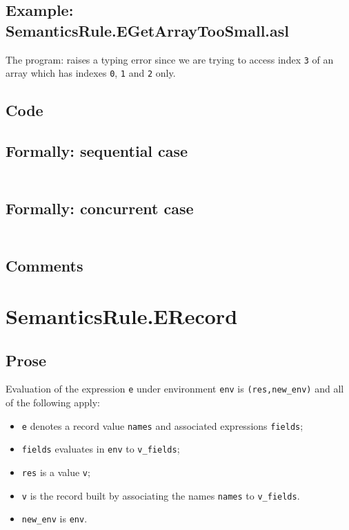 \documentclass{book}
\begin{document}
  \subsection{Example: SemanticsRule.EGetArrayTooSmall.asl}
    The program:
    raises a typing error since we are trying to access index \texttt{3} of an array
    which has indexes \texttt{0}, \texttt{1} and \texttt{2} only.

  \subsection{Code}

  \subsection{Formally: sequential case}
  \begin{align}
  \end{align} 

  \subsection{Formally: concurrent case}
  \begin{align}
  \end{align} 

  \subsection{Comments}

\section{SemanticsRule.ERecord \label{sec:SemanticsRule.ERecord}}

  \subsection{Prose}

  Evaluation of the expression \texttt{e} under environment \texttt{env} is
  \texttt{(res,new\_env)} and all of the following apply:
  \begin{itemize}
  \item \texttt{e} denotes a record value \texttt{names} and associated expressions
    \texttt{fields};
  \item \texttt{fields} evaluates in \texttt{env} to \texttt{v\_fields};
  \item \texttt{res} is a value \texttt{v};
  \item \texttt{v} is the record built by associating the names \texttt{names} to \texttt{v\_fields}.
  \item \texttt{new\_env} is \texttt{env}.
  \end{itemize}
\end{document}
